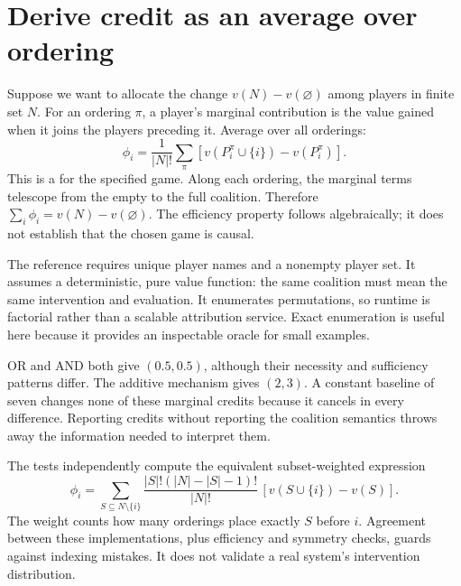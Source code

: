\section{Derive credit as an average over ordering}
Suppose we want to allocate the change $v(N)-v(\varnothing)$ among players
in finite set $N$. For an ordering $\pi$, a player's marginal contribution
is the value gained when it joins the players preceding it. Average over
all orderings:
\begin{equation}
 \phi_i=\frac{1}{|N|!}\sum_{\pi}
 \left[v(P_i^\pi\cup\{i\})-v(P_i^\pi)\right].
 \label{eq:shapley}
\end{equation}
This is a  for the specified game. Along each
ordering, the marginal terms telescope from the empty to the full coalition.
Therefore $\sum_i\phi_i=v(N)-v(\varnothing)$. The efficiency property
follows algebraically; it does not establish that the chosen game is causal.


The reference requires unique player names and a nonempty player set. It
assumes a deterministic, pure value function: the same coalition must mean
the same intervention and evaluation. It enumerates permutations, so runtime
is factorial rather than a scalable attribution service. Exact enumeration
is useful here because it provides an inspectable oracle for small examples.

\begin{center}\end{center}
OR and AND both give $(0.5,0.5)$, although their necessity and sufficiency
patterns differ. The additive mechanism gives $(2,3)$. A constant baseline
of seven changes none of these marginal credits because it cancels in every
difference. Reporting credits without reporting the coalition semantics
throws away the information needed to interpret them.

The tests independently compute the equivalent subset-weighted expression
\[
 \phi_i=\sum_{S\subseteq N\setminus\{i\}}
 \frac{|S|!(|N|-|S|-1)!}{|N|!}\,[v(S\cup\{i\})-v(S)].
\]
The weight counts how many orderings place exactly $S$ before $i$.
Agreement between these implementations, plus efficiency and symmetry
checks, guards against indexing mistakes. It does not validate a real
system's intervention distribution.


